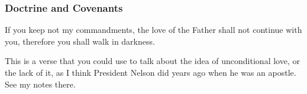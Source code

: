 				
				
		
	
		
		
	\subsubsection{Doctrine and Covenants} %
		\label{LOVE-DC}
	
		
		\begin{compactdesc}
			\item[{\hyperref[DC95-12]{DC 95:12}}] If you keep not my commandments, the love of the Father shall not continue with you, therefore you shall walk in darkness.
				\begin{compactitem}
					\item This is a verse that you could use to talk about the idea of unconditional love, or the lack of it, as I think President Nelson did years ago when he was an apostle. See my notes there.
				\end{compactitem}
		\end{compactdesc}
		
